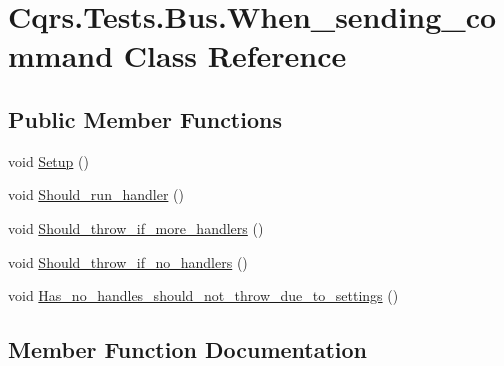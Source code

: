 \hypertarget{classCqrs_1_1Tests_1_1Bus_1_1When__sending__command}{}\section{Cqrs.\+Tests.\+Bus.\+When\+\_\+sending\+\_\+command Class Reference}
\label{classCqrs_1_1Tests_1_1Bus_1_1When__sending__command}
\subsection*{Public Member Functions}
\begin{DoxyCompactItemize}
\item 
void \hyperlink{classCqrs_1_1Tests_1_1Bus_1_1When__sending__command_a37384a49eaa87a6bfb59d6380ac98813_a37384a49eaa87a6bfb59d6380ac98813}{Setup} ()
\item 
void \hyperlink{classCqrs_1_1Tests_1_1Bus_1_1When__sending__command_a34f4ae1af0eb0e4af591e626bd29f6ff_a34f4ae1af0eb0e4af591e626bd29f6ff}{Should\+\_\+run\+\_\+handler} ()
\item 
void \hyperlink{classCqrs_1_1Tests_1_1Bus_1_1When__sending__command_aab1c48d45286be5d780572b207378ef4_aab1c48d45286be5d780572b207378ef4}{Should\+\_\+throw\+\_\+if\+\_\+more\+\_\+handlers} ()
\item 
void \hyperlink{classCqrs_1_1Tests_1_1Bus_1_1When__sending__command_af61edb6741b37c219bbc3fe3d5cf1e1c_af61edb6741b37c219bbc3fe3d5cf1e1c}{Should\+\_\+throw\+\_\+if\+\_\+no\+\_\+handlers} ()
\item 
void \hyperlink{classCqrs_1_1Tests_1_1Bus_1_1When__sending__command_ad2854163c287e27028ba21a9d273d43e_ad2854163c287e27028ba21a9d273d43e}{Has\+\_\+no\+\_\+handles\+\_\+should\+\_\+not\+\_\+throw\+\_\+due\+\_\+to\+\_\+settings} ()
\end{DoxyCompactItemize}


\subsection{Member Function Documentation}
\mbox{\label{classCqrs_1_1Tests_1_1Bus_1_1When__sending__command_ad2854163c287e27028ba21a9d273d43e_ad2854163c287e27028ba21a9d273d43e}} 
